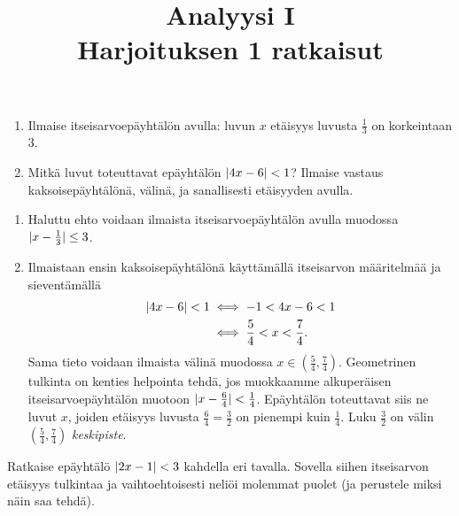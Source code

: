 \documentclass[11pt,a4paper]{amsart}
\title{Analyysi I\\Harjoituksen 1 ratkaisut}
\author{}
\date{}
\begin{document}

\begin{exercise}
  \leavevmode\par
\begin{enumerate}[label=\alph*), nosep]
  \item Ilmaise itseisarvoepäyhtälön avulla: luvun \(x\) etäisyys luvusta
    \(\frac{1}{3}\) on korkeintaan \(3\).
  \item Mitkä luvut toteuttavat epäyhtälön \(\lvert4x - 6\rvert < 1\)? Ilmaise
    vastaus kaksoisepäyhtälönä, välinä, ja sanallisesti etäisyyden avulla.
\end{enumerate}
\end{exercise}

\begin{solution}
\leavevmode\par
\begin{enumerate}[label=\alph*), nosep]
\item Haluttu ehto voidaan ilmaista itseisarvoepäyhtälön avulla muodossa
  \(\lvert x - \frac{1}{3}\rvert \leq 3\).
\item Ilmaistaan ensin kaksoisepäyhtälönä käyttämällä itseisarvon määritelmää
  ja sieventämällä
  \begin{align*}
    \lvert4x - 6\rvert < 1 &\iff -1 < 4x - 6 < 1 \\
    &\iff \frac{5}{4} < x < \frac{7}{4}.
  \end{align*}
  Sama tieto voidaan ilmaista välinä muodossa \(x \in \left(\frac{5}{4},
  \frac{7}{4}\right)\). Geometrinen tulkinta on kenties helpointa tehdä, jos
  muokkaamme alkuperäisen itseisarvoepäyhtälön muotoon
  \(\lvert x - \frac{6}{4}\rvert < \frac{1}{4}\). Epäyhtälön toteuttavat siis ne luvut
  \(x\), joiden etäisyys luvusta \(\frac{6}{4} = \frac{3}{2}\) on pienempi kuin
  \(\frac{1}{4}\). Luku \(\frac{3}{2}\) on välin
  \(\left(\frac{5}{4}, \frac{7}{4}\right)\) \emph{keskipiste}.
\end{enumerate}
\end{solution}

\begin{exercise}
Ratkaise epäyhtälö \(\lvert2x - 1\rvert < 3\) kahdella eri tavalla. Sovella siihen
itseisarvon etäisyys tulkintaa ja vaihtoehtoisesti neliöi molemmat puolet
(ja perustele miksi näin saa tehdä).
\end{exercise}
\end{document}
